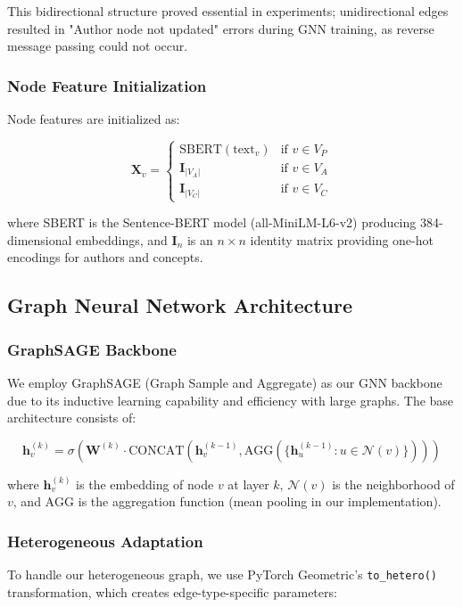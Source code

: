 \documentclass[conference]{IEEEtran}
\begin{document}
This bidirectional structure proved essential in experiments; unidirectional edges resulted in "Author node not updated" errors during GNN training, as reverse message passing could not occur.

\subsubsection{Node Feature Initialization}
Node features are initialized as:

\begin{equation}
\mathbf{X}_v = \begin{cases} 
\text{SBERT}(\text{text}_v) & \text{if } v \in V_P \\
\mathbf{I}_{|V_A|} & \text{if } v \in V_A \\
\mathbf{I}_{|V_C|} & \text{if } v \in V_C
\end{cases}
\end{equation}

where SBERT is the Sentence-BERT model (all-MiniLM-L6-v2) producing 384-dimensional embeddings, and $\mathbf{I}_n$ is an $n \times n$ identity matrix providing one-hot encodings for authors and concepts.

\subsection{Graph Neural Network Architecture}

\subsubsection{GraphSAGE Backbone}
We employ GraphSAGE (Graph Sample and Aggregate) as our GNN backbone due to its inductive learning capability and efficiency with large graphs. The base architecture consists of:

\begin{equation}
\mathbf{h}_v^{(k)} = \sigma\left(\mathbf{W}^{(k)} \cdot \text{CONCAT}\left(\mathbf{h}_v^{(k-1)}, \text{AGG}\left(\{\mathbf{h}_u^{(k-1)} : u \in \mathcal{N}(v)\}\right)\right)\right)
\end{equation}

where $\mathbf{h}_v^{(k)}$ is the embedding of node $v$ at layer $k$, $\mathcal{N}(v)$ is the neighborhood of $v$, and $\text{AGG}$ is the aggregation function (mean pooling in our implementation).

\subsubsection{Heterogeneous Adaptation}
To handle our heterogeneous graph, we use PyTorch Geometric's \texttt{to\_hetero()} transformation, which creates edge-type-specific parameters:
\end{document}
